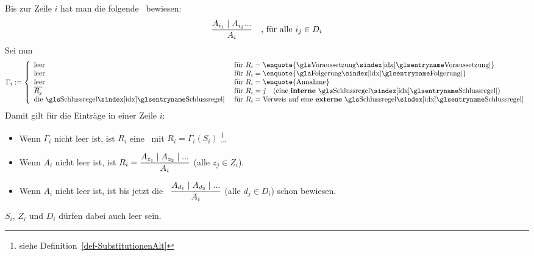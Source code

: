 {Bis zur Zeile $i$ hat man die folgende \Schlussregel\ bewiesen:
\[ \frac{A_{i_1} \mathrel{\mid} A_{i_2} ...}{A_i} \quad \text{, für alle } i_j \in D_i \]
Sei nun
\[
	\Gamma_i \defeq
	\left\{
		\begin{array}{ll}
			\text{leer}    & \text{ für } R_i = \text{\enquote{\Voraussetzung}} \\
			\text{leer}    & \text{ für } R_i = \text{\enquote{\Folgerung}}     \\
			\text{leer}    & \text{ für } R_i = \text{\enquote{Annahme}}        \\
			\overline{R_j} & \text{ für } R_i = j \quad \text{(eine \defn{interne} \Schlussregel)} \\
			\text{die \Schlussregel} & \text{ für } R_i = \text{Verweis auf eine \defn{externe} \Schlussregel}
		\end{array}
	\right.
\]
Damit gilt für die Einträge in einer Zeile $i$:
\begin{itemize}
	\item Wenn $\Gamma_i$ nicht leer ist, ist $R_i$ eine \Schlussregel\ mit $R_i = \Gamma_i(S_i)$%
	\footnote{%
		siehe Definition~\eqref{def-SubstitutionenAlt} 
	}.
	\item Wenn $A_i$ nicht leer ist, ist $R_i = \dfrac{A_{z_1} \mathrel{\mid} A_{z_2} \mathrel{\mid} ...}{A_i}$ (alle $z_j \in Z_i$).
	\item Wenn $A_i$ nicht leer ist, ist bis jetzt die \Schlussregel\ $\dfrac{A_{d_1} \mathrel{\mid} A_{d_2} \mathrel{\mid} ...}{A_i}$ (alle $d_j \in D_i$) schon bewiesen.
\end{itemize}
$S_i$, $Z_i$ und $D_i$ dürfen dabei auch leer sein.

}

